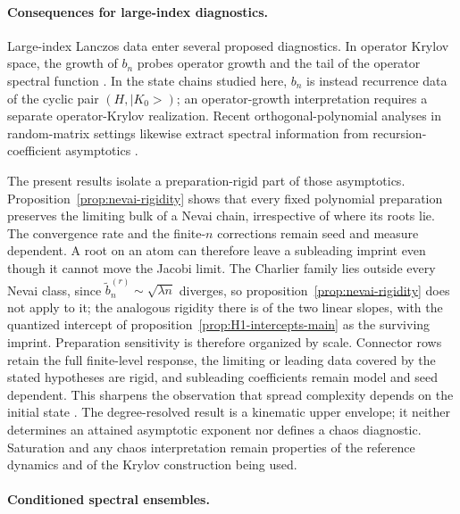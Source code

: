 \documentclass[a4paper,11pt]{article}
\def\ket#1{|#1>}%
\theoremstyle{definition}
\theoremstyle{remark}
\newcommand{\ket}[1]{|#1\rangle}
\begin{document}
\paragraph{Consequences for large-index diagnostics.}
\label{subsec:chaos-diagnostic}

Large-index Lanczos data enter several proposed diagnostics.  In operator Krylov space, the
growth of $b_n$ probes operator growth and the tail of the operator spectral function
\cite{Parker2019}.  In the state chains studied here, $b_n$ is instead recurrence data of the
cyclic pair $(H,\ket{K_0})$; an operator-growth interpretation requires a separate operator-Krylov
realization.  Recent
orthogonal-polynomial analyses in random-matrix settings likewise extract
spectral information from recursion-coefficient asymptotics \cite{Qu2025LanczosOP}.

The present results isolate a preparation-rigid part of those asymptotics.  Proposition~\ref{prop:nevai-rigidity} shows that
every fixed polynomial preparation preserves the limiting bulk of a Nevai chain, irrespective of
where its roots lie.  The convergence rate and the finite-$n$ corrections remain seed and measure
dependent.  A root on an atom can therefore leave a subleading imprint even though it cannot move
the Jacobi limit. The Charlier family lies outside every Nevai class, since $\widetilde b_n^{(r)}\sim\sqrt{\lambda n}$ diverges, so proposition~\ref{prop:nevai-rigidity} does not apply to it; the analogous rigidity there is of the two linear slopes, with the quantized intercept of proposition~\ref{prop:H1-intercepts-main} as the surviving imprint.  Preparation sensitivity is therefore organized by
scale.  Connector rows retain the full finite-level response, the limiting or leading data covered
by the stated hypotheses are rigid, and subleading coefficients remain model and seed dependent.
This sharpens the observation that spread complexity depends on the initial state
\cite{SreeramKannanModakAravinda2025,Balasubramanian:2025variations}.  The degree-resolved result
is a kinematic upper envelope; it neither determines an attained asymptotic
exponent nor defines a chaos diagnostic.  Saturation and any chaos interpretation remain
properties of the reference dynamics and of the Krylov construction being used.

\paragraph{Conditioned spectral ensembles.}
\label{subsec:palm}
\end{document}
